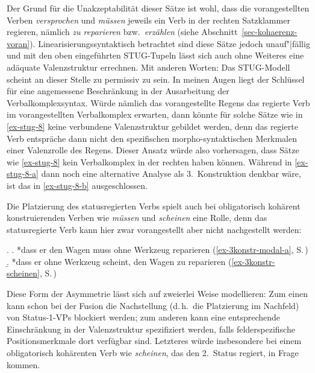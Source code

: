 Der Grund für die Unakzeptabilität dieser Sätze ist wohl, dass die vorangestellten Verben {\it versprochen} und {\it müssen} jeweils ein Verb in der rechten Satzklammer regieren, nämlich {\it zu reparieren} bzw.\ {\it erzählen} (siehe Abschnitt~\ref{sec-kohaerenz-voran}). Linearisierungssyntaktisch betrachtet sind diese Sätze jedoch unauf"|fällig und mit den oben eingeführten STUG-Tupeln lässt sich auch ohne Weiteres eine adäquate Valenzstruktur errechnen. Mit anderen Worten: Das STUG-Modell scheint an dieser Stelle zu permissiv zu sein. In meinen Augen liegt der Schlüssel für eine angemessene Beschränkung in der Ausarbeitung der Verbalkomplexsyntax. Würde nämlich das vorangestellte Regens das regierte Verb im vorangestellten Verbalkomplex erwarten, dann könnte für solche Sätze wie in \ref{ex-stug-8} keine verbundene Valenzstruktur gebildet werden, denn das regierte Verb entspräche dann nicht den spezifischen morpho-syntaktischen Merkmalen einer Valenzrolle des Regens. Dieser Ansatz würde also vorhersagen, dass Sätze wie \ref{ex-stug-8} kein Verbalkomplex in der rechten  haben können. Während in \ref{ex-stug-8-a} dann noch eine alternative Analyse als 3.~Konstruktion denkbar wäre, ist das in \ref{ex-stug-8-b} ausgeschlossen. 

Die Platzierung des statusregierten Verbs spielt auch bei obligatorisch kohärent konstruierenden Verben wie {\it müssen} und {\it scheinen} eine Rolle, denn das statusregierte Verb kann hier zwar vorangestellt aber nicht nachgestellt werden:

\ex.
\a. *dass er den Wagen muss ohne Werkzeug reparieren \hfill (\ref{ex-3konstr-modal-a}, S.\,\pageref{ex-3konstr-modal-a})
\b. *dass er ohne Werkzeug scheint, den Wagen zu reparieren \hfill (\ref{ex-3konstr-scheinen}, S.\,\pageref{ex-3konstr-scheinen})

Diese Form der Asymmetrie lässt sich auf zweierlei Weise modellieren: Zum einen kann schon bei der Fusion die Nachstellung (d.\,h.\ die Platzierung im Nachfeld) von Status-1-VPs blockiert werden; zum anderen kann eine entsprechende Einschränkung in der Valenzstruktur spezifiziert werden, falls felderspezifische \clearpage Positionsmerkmale dort verfügbar sind. Letzteres würde insbesondere bei einem obligatorisch kohärenten Verb wie {\it scheinen}, das den 2.~Status regiert, in Frage kommen.


